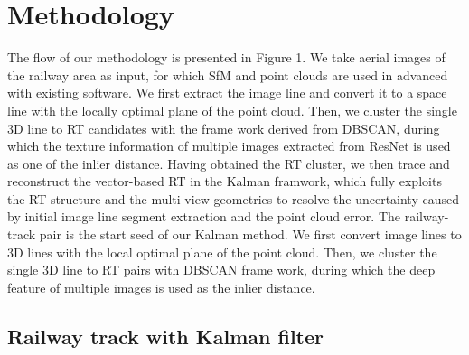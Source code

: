 \section{Methodology}

The flow of our methodology is presented in Figure 1.
We take aerial images of the railway area as input,
for which SfM and point clouds are used in advanced with existing software.
We first extract the image line and convert it to a space line with the locally optimal plane of the point cloud.
Then,
we cluster the single 3D line to RT candidates with the frame work derived from DBSCAN,  
during which the texture information of multiple images extracted from ResNet is used as one of the inlier distance.
Having obtained the RT cluster, 
we then trace and reconstruct the vector-based RT in the Kalman framwork,
which fully exploits the RT structure and the multi-view geometries to resolve the uncertainty caused by initial image line segment extraction and the point cloud error.
The railway-track pair is the start seed of our Kalman method.
We first convert image lines to 3D lines with the local optimal plane of the point cloud.
Then,
we cluster the single 3D line to RT pairs with DBSCAN frame work,  
during which the deep feature of multiple images is used as the inlier distance.





\subsection{Railway track with Kalman filter}

